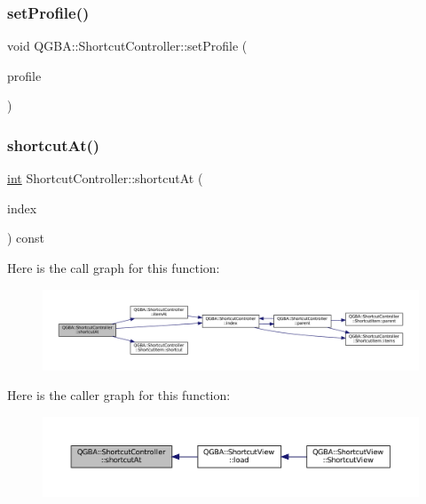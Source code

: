 \subsubsection{\texorpdfstring{set\+Profile()}{setProfile()}}
{\footnotesize\ttfamily void Q\+G\+B\+A\+::\+Shortcut\+Controller\+::set\+Profile (\begin{DoxyParamCaption}\item[{const Q\+String \&}]{profile }\end{DoxyParamCaption})}

\mbox{\label{class_q_g_b_a_1_1_shortcut_controller_a5589b06fa6756190e5acf488b0795d35}} 
\subsubsection{\texorpdfstring{shortcut\+At()}{shortcutAt()}}
{\footnotesize\ttfamily \mbox{\hyperlink{ioapi_8h_a787fa3cf048117ba7123753c1e74fcd6}{int}} Shortcut\+Controller\+::shortcut\+At (\begin{DoxyParamCaption}\item[{const Q\+Model\+Index \&}]{index }\end{DoxyParamCaption}) const}

Here is the call graph for this function\+:
\nopagebreak
\begin{figure}[H]
\begin{center}
\leavevmode
\includegraphics[width=350pt]{class_q_g_b_a_1_1_shortcut_controller_a5589b06fa6756190e5acf488b0795d35_cgraph}
\end{center}
\end{figure}
Here is the caller graph for this function\+:
\nopagebreak
\begin{figure}[H]
\begin{center}
\leavevmode
\includegraphics[width=350pt]{class_q_g_b_a_1_1_shortcut_controller_a5589b06fa6756190e5acf488b0795d35_icgraph}
\end{center}
\end{figure}
\mbox{\label{class_q_g_b_a_1_1_shortcut_controller_a358ace743ae3c305cee270a0d54d6c82}} 
